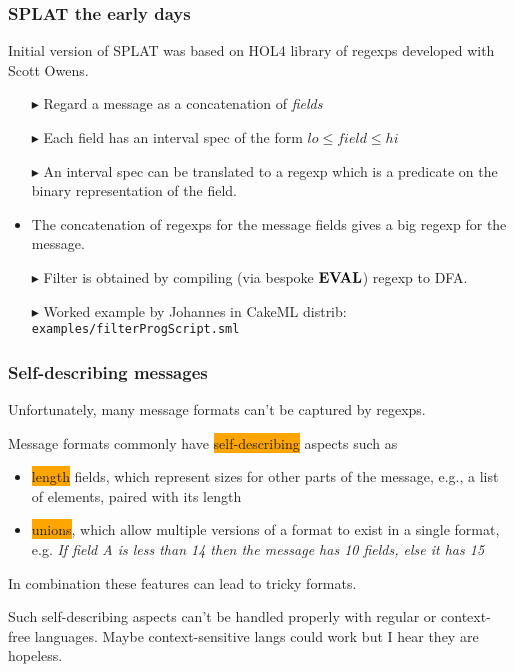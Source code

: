 \documentclass{beamer}
\newcommand{\kemph}[1]{\colorbox{orange}{#1}}
\newcommand{\konst}[1]{\ensuremath{\mbox{\bf{#1}}}}
\begin{document}
\begin{frame}[fragile]\frametitle{SPLAT the early days}

Initial version of SPLAT was based on HOL4 library of regexps developed with Scott Owens.

\begin{itemize}[<+->]
\item [$\blacktriangleright$] Regard a message as a concatenation of \emph{fields}
\item [$\blacktriangleright$] Each field has an interval spec of the form $\mathit{lo} \leq \mathit{field} \leq \mathit{hi}$
\item [$\blacktriangleright$] An interval spec can be translated to a regexp which is a
  predicate on the binary representation of the field.
\item The concatenation of regexps for the message fields gives a big regexp for the message.
\item [$\blacktriangleright$] Filter is obtained by compiling (via bespoke \konst{EVAL}) regexp to DFA.
\item [$\blacktriangleright$] Worked example by Johannes in CakeML distrib: \verb+examples/filterProgScript.sml+
\end{itemize}

\end{frame}

\begin{frame}[fragile]\frametitle{Self-describing messages}

Unfortunately, many message formats can't be captured by regexps.

Message formats commonly have \kemph{self-describing} aspects such as

\begin{itemize}

\item \kemph{length} fields, which represent sizes for other parts of
  the message, e.g., a list of elements, paired with its length

\item \kemph{unions}, which allow multiple versions of a format to
  exist in a single format, e.g.  \textit{If field A is less than 14
    then the message has 10 fields, else it has 15}

\end{itemize}

In combination these features can lead to tricky formats.

Such self-describing aspects can't be handled properly with regular or
context-free languages. Maybe context-sensitive langs could work but I
hear they are hopeless.


\end{frame}
\end{document}
